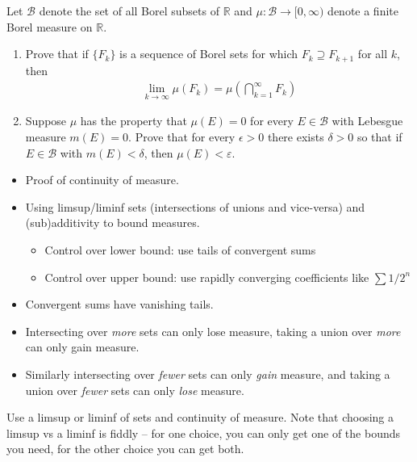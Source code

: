 Let \(\mathcal B\) denote the set of all Borel subsets of
\({\mathbb{R}}\) and \(\mu : \mathcal B \to [0, \infty)\) denote a
finite Borel measure on \({\mathbb{R}}\).

\begin{enumerate}
\def\labelenumi{\alph{enumi}.}
\item
  Prove that if \(\{F_k\}\) is a sequence of Borel sets for which
  \(F_k \supseteq F_{k+1}\) for all \(k\), then
  \begin{align*}
  \lim _{k \rightarrow \infty} \mu\left(F_{k}\right)=\mu\left(\bigcap_{k=1}^{\infty} F_{k}\right)
  \end{align*}
\item
  Suppose \(\mu\) has the property that \(\mu (E) = 0\) for every
  \(E \in \mathcal B\) with Lebesgue measure \(m(E) = 0\). Prove that
  for every \(\epsilon > 0\) there exists \(\delta > 0\) so that if
  \(E \in \mathcal B\) with \(m(E) < δ\), then \(\mu(E) < ε\).
\end{enumerate}

\begin{concept}

\envlist

\begin{itemize}
\tightlist
\item
  Proof of continuity of measure.
\item
  Using limsup/liminf sets (intersections of unions and vice-versa) and
  (sub)additivity to bound measures.

  \begin{itemize}
  \tightlist
  \item
    Control over lower bound: use tails of convergent sums
  \item
    Control over upper bound: use rapidly converging coefficients like
    \(\sum 1/2^n\)
  \end{itemize}
\item
  Convergent sums have vanishing tails.
\item
  Intersecting over \emph{more} sets can only lose measure, taking a
  union over \emph{more} can only gain measure.
\item
  Similarly intersecting over \emph{fewer} sets can only \emph{gain}
  measure, and taking a union over \emph{fewer} sets can only
  \emph{lose} measure.
\end{itemize}

\end{concept}

\begin{strategy}

Use a limsup or liminf of sets and continuity of measure. Note that
choosing a limsup vs a liminf is fiddly -- for one choice, you can only
get one of the bounds you need, for the other choice you can get both.

\end{strategy}


